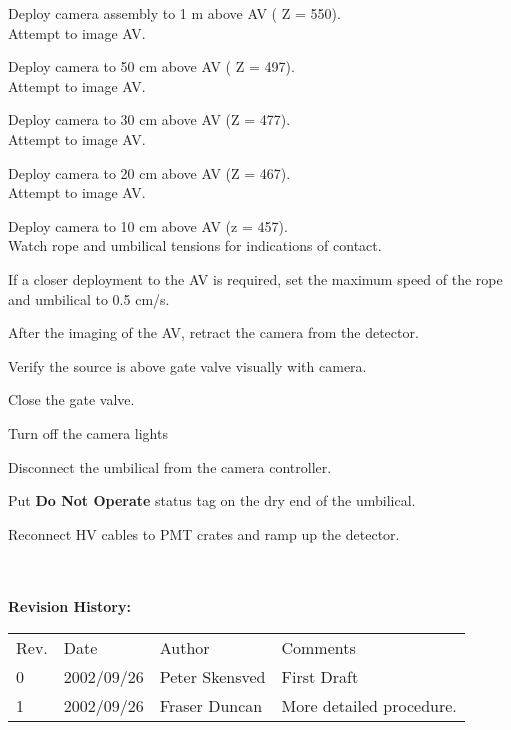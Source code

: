 \begin{enumerate}
\checkitem Deploy camera assembly to 1 m above AV ( Z = 550).\\
  Attempt to image AV.

\checkitem Deploy camera to 50 cm above AV ( Z = 497).\\
  Attempt to image AV.

\checkitem Deploy camera to 30 cm above AV (Z = 477).\\
  Attempt to image AV.

\checkitem Deploy camera to 20 cm above AV (Z = 467).\\
  Attempt to image AV.

\checkitem  Deploy camera to 10 cm above AV (z = 457).\\
   Watch rope and umbilical tensions for indications of 
   contact.

\checkitem If a closer deployment to the AV is required,
  set the maximum speed of the rope and umbilical to 0.5 cm/s.

\checkitem After the imaging of the AV, retract the  camera from the
  detector.

\checkitem Verify the source is above gate valve visually with camera.

\checkitem Close the gate valve.

\checkitem Turn off the camera lights

\checkitem Disconnect the umbilical from the camera controller.

\checkitem Put {\bf Do Not Operate} status tag on the dry end of the
  umbilical.

\checkitem Reconnect HV cables to PMT crates and ramp up the detector.

\end{enumerate}



{\small
~\\
~\\
\noindent
{\bf Revision History:}\\
\begin{tabular}{llll}
Rev. & Date & Author & Comments\\
0           & 
2002/09/26  & 
Peter Skensved &
\parbox[t]{3.0in}{
  First Draft
}\\

1             & 
2002/09/26    & 
Fraser Duncan &
\parbox[t]{3.0in}{
 More detailed procedure.
}
\end{tabular}
}



\newpage
\markright{\standardheader}




